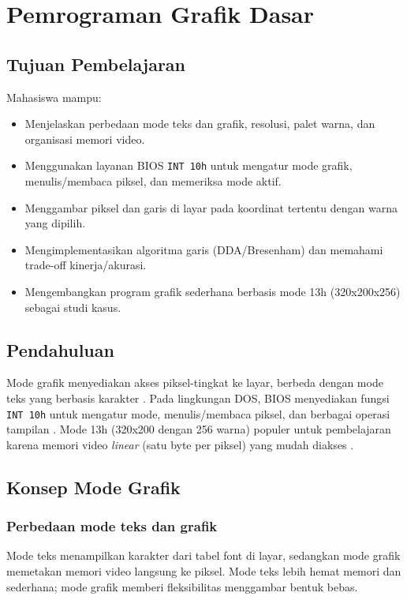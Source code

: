\chapter{Pemrograman Grafik Dasar}

\section{Tujuan Pembelajaran}
Mahasiswa mampu:
\begin{itemize}
    \item Menjelaskan perbedaan mode teks dan grafik, resolusi, palet warna, dan organisasi memori video.
    \item Menggunakan layanan BIOS \texttt{INT 10h} untuk mengatur mode grafik, menulis/membaca piksel, dan memeriksa mode aktif.
    \item Menggambar piksel dan garis di layar pada koordinat tertentu dengan warna yang dipilih.
    \item Mengimplementasikan algoritma garis (DDA/Bresenham) dan memahami trade-off kinerja/akurasi.
    \item Mengembangkan program grafik sederhana berbasis mode 13h (320x200x256) sebagai studi kasus.
\end{itemize}

\section{Pendahuluan}
Mode grafik menyediakan akses piksel-tingkat ke layar, berbeda dengan mode teks yang berbasis karakter \cite{susanto1995belajar}. Pada lingkungan DOS, BIOS menyediakan fungsi \texttt{INT 10h} untuk mengatur mode, menulis/membaca piksel, dan berbagai operasi tampilan \cite{hyde2010art}. Mode 13h (320x200 dengan 256 warna) populer untuk pembelajaran karena memori video \textit{linear} (satu byte per piksel) yang mudah diakses \cite{nopi2003tutorial}.

\section{Konsep Mode Grafik}
\subsection{Perbedaan mode teks dan grafik}
Mode teks menampilkan karakter dari tabel font di layar, sedangkan mode grafik memetakan memori video langsung ke piksel. Mode teks lebih hemat memori dan sederhana; mode grafik memberi fleksibilitas menggambar bentuk bebas.

